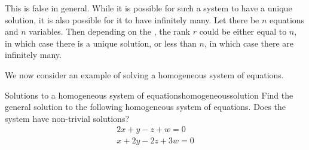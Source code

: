 \begin{solution}
  This is false in general. While it is possible for such a system to
  have a unique solution, it is also possible for it to have
  infinitely many. Let there be $n$ equations and $n$ variables.  Then
  depending on the {\ef}, the rank $r$ could be either equal to $n$,
  in which case there is a unique solution, or less than $n$, in which
  case there are infinitely many.
\end{solution}

We now consider an example of solving a homogeneous system of equations.

\begin{example}{Solutions to a homogeneous system of equations}{homogeneoussolution}
Find the general solution to the following homogeneous system of
equations. Does the system have non-trivial solutions?
\begin{equation*}
\begin{array}{c}
2x + y - z + w = 0 \\
x + 2y - 2z + 3w = 0
\end{array}
\end{equation*}
\end{example}

